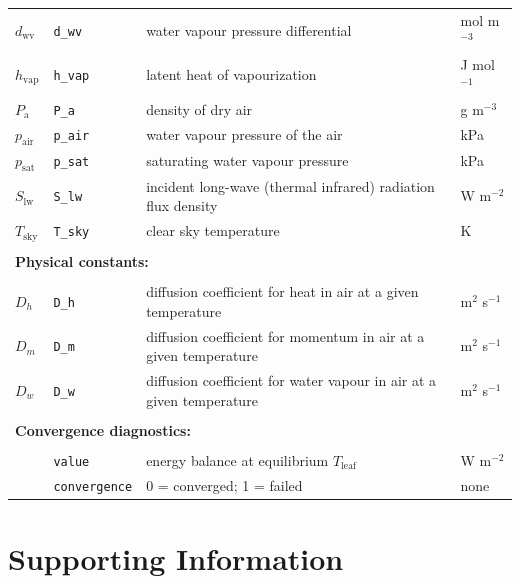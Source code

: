 \documentclass[11pt, oneside]{article}
\newcommand{\code}[1]{{\texttt{#1}}}
\newcommand{\tleaf}{$T_\mathrm{leaf}$}
\begin{document}
\begin{table}[ht]
\begin{center}
{\begin{tabular}{llll}
  \\
  $d_\mathrm{wv}$  & \code{d\_wv}   & water vapour pressure differential & mol m$^{-3}$ \\
  $h_\mathrm{vap}$ & \code{h\_vap}  & latent heat of vapourization & J mol$^{-1}$ \\
  $P_\mathrm{a}$   & \code{P\_a}    & density of dry air & g m$^{-3}$ \\
  $p_\mathrm{air}$ & \code{p\_air}  & water vapour pressure of the air & kPa \\
  $p_\mathrm{sat}$ & \code{p\_sat}  & saturating water vapour pressure & kPa \\
  $S_\mathrm{lw}$  & \code{S\_lw}   & incident long-wave (thermal infrared) radiation flux density & W m$^{-2}$ \\
  $T_\mathrm{sky}$ & \code{T\_sky}  & clear sky temperature & K \\
  \\
  \multicolumn{4}{l}{\textbf{Physical constants:}} \\
  \\
  $D_h$            & \code{D\_h}    & diffusion coefficient for heat in air at a given temperature & m$^2$ s$^{-1}$ \\
  $D_m$            & \code{D\_m}    & diffusion coefficient for momentum in air at a given temperature & m$^2$ s$^{-1}$ \\
  $D_w$            & \code{D\_w} & diffusion coefficient for water vapour in air at a given temperature        & m$^2$ s$^{-1}$ \\
  \\
  \multicolumn{4}{l}{\textbf{Convergence diagnostics:}} \\
  \\
                   & \code{value} & energy balance at equilibrium \tleaf & W m$^{-2}$ \\
                   & \code{convergence} & 0 = converged; 1 = failed & none \\

\bottomrule

\end{tabular}}
\end{center}
\label{table:table_output}
\end{table}


\clearpage

\section*{Supporting Information}
\end{document}
